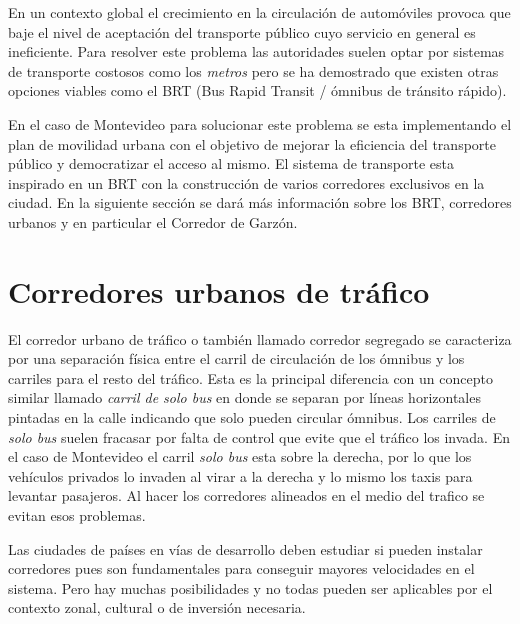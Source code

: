 En un contexto global el crecimiento en la circulación de automóviles provoca que baje el nivel de aceptación del transporte público cuyo servicio en general es ineficiente. Para resolver este problema las autoridades suelen optar por sistemas de transporte costosos como los \emph{metros} pero se ha demostrado que existen otras opciones viables como el BRT (Bus Rapid Transit / ómnibus de tránsito rápido)\citep{BRT_Dial}.

En el caso de Montevideo para solucionar este problema se esta implementando el plan de movilidad urbana \citep{PlanMovilidad} con el objetivo de mejorar la eficiencia del transporte público y democratizar el acceso al mismo. El sistema de transporte esta inspirado en un BRT con la construcción de varios corredores exclusivos en la ciudad. En la siguiente sección se dará más información sobre los BRT, corredores urbanos y en particular el Corredor de Garzón.



\section{Corredores urbanos de tráfico}

El corredor urbano de tráfico o también llamado corredor segregado se caracteriza por una separación física entre el carril de circulación de los ómnibus y los carriles para el resto del tráfico. 
Esta es la principal diferencia con un concepto similar llamado \emph{carril de solo bus} en donde se separan por líneas horizontales pintadas en la calle indicando que solo pueden circular ómnibus. Los carriles de \emph{solo bus} suelen fracasar por falta de control que evite que el tráfico los invada. En el caso de Montevideo el carril \emph{solo bus} esta sobre la derecha, por lo que los vehículos privados lo invaden al virar a la derecha y lo mismo los taxis para levantar pasajeros. Al hacer los corredores alineados en el medio del trafico se evitan esos problemas.  

Las ciudades de países en vías de desarrollo deben estudiar si pueden instalar corredores pues son fundamentales para conseguir mayores velocidades en el sistema. Pero hay muchas posibilidades y no todas pueden ser aplicables por el contexto zonal, cultural o de inversión necesaria.

